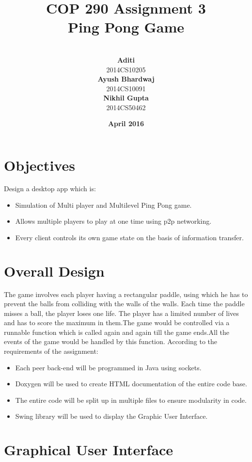 \documentclass{article}
\title{\vspace*{\fill} \textbf{COP 290 Assignment 3}
	  \\ {\Large \textbf{Ping Pong Game}}
}
\author{
	\vspace{5mm} \\
	 \textbf{Aditi}\\
	2014CS10205 \vspace{2mm} \\
	\textbf{Ayush Bhardwaj}\\ 
	2014CS10091 \vspace{2mm} \\
	\textbf{Nikhil Gupta}\\ 
	2014CS50462 \vspace{2mm}
}
\date{\vspace{3mm} \textbf{April 2016} \vspace*{\fill}}
\begin{document}
	\maketitle

	\newpage

	\tableofcontents

	\newpage

	\section{Objectives}
	Design a desktop app which is:
	\begin{itemize}
	\item Simulation of Multi player and Multilevel Ping Pong game.
	\item Allows multiple players to play at one time using p2p networking.
	\item Every client controls its own game state on the basis of information transfer.
	\end{itemize}

	\section{Overall Design}
		The game involves each player having a rectangular paddle, using which he has to prevent the balls from colliding with the walls of the walls. Each time the paddle misses a ball, the player loses one life. The player has a limited number of lives and has to score the maximum in them.The game would be controlled via a runnable function which is called again and again till the game ends.All the events of the game would be handled by this function. According to the requirements of the assignment:
				\begin{itemize}
			\item Each peer back-end will be programmed in Java using sockets.
			\item Doxygen will be used to create HTML documentation of the entire code base.
			\item The entire code will be split up in multiple files to ensure modularity in code.
			\item Swing library will be used to display the Graphic User Interface.
		\end{itemize}
	\section{Graphical User Interface}
	
\end{document}
